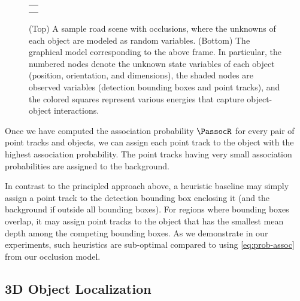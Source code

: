 \begin{wrapfigure}[18]{r}{0.5\textwidth}
  \centering\scriptsize
  \begin{tabular}{c}
    \newcommand{\imagewidth}{7.5cm}
      \hspace{-0.8cm}
     \\
      \hspace{-0.8cm}
    
  \end{tabular}
  \caption{(Top) A sample road scene with occlusions, where the unknowns of each object are modeled as random variables. (Bottom) The graphical model corresponding to the above frame. In particular, the numbered nodes denote the unknown state variables of each object (position, orientation, and dimensions), the shaded nodes are observed variables (detection bounding boxes and point tracks), and the colored squares represent various energies that capture object-object interactions.}
  \label{fig:graphmodel}
\end{wrapfigure}
%

Once we have computed the association probability $\PassocR$ for every pair of point tracks and objects, we can assign each point track to the object with the highest association probability. The point tracks having very small association probabilities are assigned to the background.

In contrast to the principled approach above, a heuristic baseline may simply assign a point track to the detection bounding box enclosing it (and the background if outside all bounding boxes). For regions where bounding boxes overlap, it may assign point tracks to the object that has the smallest mean depth among the competing bounding boxes. As we demonstrate in our experiments, such heuristics are sub-optimal compared to using \eqref{eq:prob-assoc} from our occlusion model.


\subsection{3D Object Localization}
\label{sec:localization}

